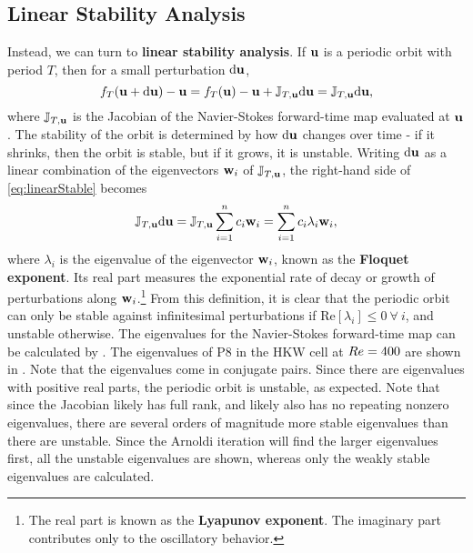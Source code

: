 \subsection{Linear Stability Analysis}\label{sec:LSA}

Instead, we can turn to {\bf linear stability analysis}. If $\mathbf{u}$ is a periodic orbit with period $T$, then for a small perturbation ${\bf \textrm{d}}\mathbf{u}$, 
\begin{equation}\label{eq:linearStable}
 f_T(\mathbf{u} + {\bf \textrm{d}}\mathbf{u}) - \mathbf{u} =  f_T(\mathbf{u}) - \mathbf{u} + \mathbb{J}_{T,\mathbf{u}}{\bf \textrm{d}}\mathbf{u} =  \mathbb{J}_{T,\mathbf{u}}{\bf \textrm{d}}\mathbf{u},
\end{equation} 
where $ \mathbb{J}_{T,\mathbf{u}}$ is the Jacobian of the Navier-Stokes forward-time map evaluated at $\mathbf{u}$. The stability of the orbit is determined by how  ${\bf \textrm{d}}\mathbf{u}$ changes over time - if it shrinks, then the orbit is stable, but if it grows, it is unstable. Writing  ${\bf \textrm{d}}\mathbf{u}$ as a linear combination of the eigenvectors $\mathbf{w}_i$ of  $ \mathbb{J}_{T,\mathbf{u}}$, the right-hand side of \eqref{eq:linearStable} becomes
\begin{equation}\label{eq:oneOrbit}
 \mathbb{J}_{T,\Vector{u}}{\bf \textrm{d}}\Vector{u} =  \mathbb{J}_{T,\Vector{u}}\sum{i = 1}{n}{c_i\Vector{w}_i} = \sum{i = 1}{n}{c_i\lambda_i\Vector{w}_i},
\end{equation}  
where $\lambda_i$ is the eigenvalue of the eigenvector $\mathbf{w}_i$, known as the {\bf Floquet exponent}. Its real part measures the exponential rate of decay or growth of perturbations along $\mathbf{w}_i$.\footnote{The real part is known as the {\bf Lyapunov exponent}. The imaginary part contributes only to the oscillatory behavior.}   From this definition, it is clear that the periodic orbit can only be stable against infinitesimal perturbations if $\textrm{Re}[\lambda_i]  \leq 0~\forall~i$, and unstable otherwise. The eigenvalues for the Navier-Stokes forward-time map can be calculated by . The eigenvalues of P8 in the HKW cell at $Re=400$ are shown in . Note that the eigenvalues come in conjugate pairs. Since there are eigenvalues with positive real parts, the periodic orbit is unstable, as expected. Note that since the Jacobian likely has full rank, and likely also has no repeating nonzero eigenvalues, there are several orders of magnitude more stable eigenvalues than there are unstable. Since the Arnoldi iteration will find the larger eigenvalues first, all the unstable eigenvalues are shown, whereas only the weakly stable eigenvalues are calculated.\\

